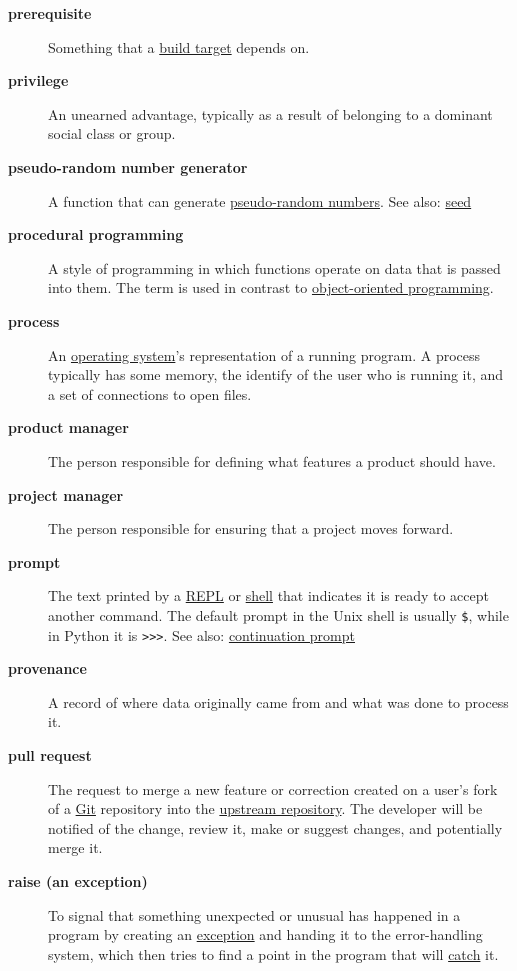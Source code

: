 \documentclass[
]{krantz}
\begin{document}
\begin{description}
\item[\textbf{prerequisite}]
Something that a \protect\hyperlink{build_target}{build target} depends on.
\item[\textbf{privilege}]
An unearned advantage, typically as a result of belonging to a dominant social class or group.
\item[\textbf{pseudo-random number generator}]
A function that can generate \protect\hyperlink{pseudo_random_number}{pseudo-random numbers}. See also: \protect\hyperlink{seed}{seed}
\item[\textbf{procedural programming}]
A style of programming in which functions operate on data that is passed into them. The term is used in contrast to \protect\hyperlink{oop}{object-oriented programming}.
\item[\textbf{process}]
An \protect\hyperlink{operating_system}{operating system}'s representation of a running program. A process typically has some memory, the identify of the user who is running it, and a set of connections to open files.
\item[\textbf{product manager}]
The person responsible for defining what features a product should have.
\item[\textbf{project manager}]
The person responsible for ensuring that a project moves forward.
\item[\textbf{prompt}]
The text printed by a \protect\hyperlink{repl}{REPL} or \protect\hyperlink{shell}{shell} that indicates it is ready to accept another command. The default prompt in the Unix shell is usually \texttt{\$}, while in Python it is \texttt{\textgreater{}\textgreater{}\textgreater{}}. See also: \protect\hyperlink{continuation_prompt}{continuation prompt}
\item[\textbf{provenance}]
A record of where data originally came from and what was done to process it.
\item[\textbf{pull request}]
The request to merge a new feature or correction created on a user's fork of a \protect\hyperlink{git}{Git} repository into the \protect\hyperlink{upstream_repository}{upstream repository}. The developer will be notified of the change, review it, make or suggest changes, and potentially merge it.
\item[\textbf{raise (an exception)}]
To signal that something unexpected or unusual has happened in a program by creating an \protect\hyperlink{exception}{exception} and handing it to the error-handling system, which then tries to find a point in the program that will \protect\hyperlink{catch_exception}{catch} it.

\end{description}
\end{document}

